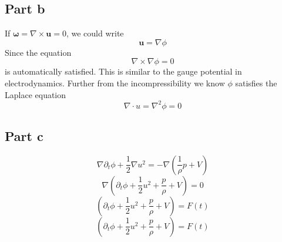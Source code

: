 \documentclass[a4paper,12pt]{article}
\begin{document}
\subsection{Part b}
If $\bm \omega =\nabla\times \bm u =0$, we could write
\begin{equation}
\bm u=\nabla \phi
\end{equation}
Since the equation
\begin{equation}
\nabla\times \nabla\phi =0
\end{equation}
is automatically satisfied. This is similar to the gauge potential in electrodynamics. Further from the incompressibility we know $\phi$ satisfies the Laplace equation
\begin{equation}
\nabla\cdot u=\nabla^2 \phi=0
\end{equation}
\subsection*{Part c}
\begin{equation}
	\nabla \partial_t \phi+\frac{1}{2}\nabla u^2=-\nabla \left(\frac{1}{\rho} p+ V\right)
\end{equation}
\begin{equation}
	\nabla \left(\partial_t \phi+\frac{1}{2} u^2+\frac{p}{\rho} + V\right)=0
\end{equation}
\begin{equation}
 \left(\partial_t \phi+\frac{1}{2} u^2+\frac{p}{\rho} + V\right)=F(t)
\end{equation}
\begin{equation} \label{eq:flow}
	\left(\partial_t \phi+\frac{1}{2} u^2+\frac{p}{\rho} + V\right)=F(t)
\end{equation}
\end{document}
